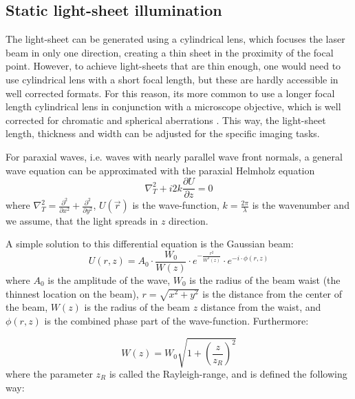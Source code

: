 
  \subsection{Static light-sheet illumination}
    The light-sheet can be generated using a cylindrical lens, which focuses the laser beam in only one direction, creating a thin sheet in the proximity of the focal point. However, to achieve light-sheets that are thin enough, one would need to use cylindrical lens with a short focal length, but these are hardly accessible in well corrected formats. For this reason, its more common to use a longer focal length cylindrical lens in conjunction with a microscope objective, which is well corrected for chromatic and spherical aberrations \cite{greger_basic_2007}. This way, the light-sheet length, thickness and width can be adjusted for the specific imaging tasks.

    For paraxial waves, i.e. waves with nearly parallel wave front normals, a general wave equation can be approximated with the paraxial Helmholz equation \cite{krzic_multiple-view_2009, saleh_fundamentals_2007}
    \begin{equation}
      \nabla_T^2 + i 2k \frac{\partial U}{\partial z} = 0
      \label{eq:helmholtz}
    \end{equation}
    where $\nabla_T^2 = \frac{\partial^2}{\partial x^2} + \frac{\partial^2}{\partial y^2}$, $U(\vec{r})$ is the wave-function, $k=\frac{2\pi}{\lambda}$ is the wavenumber and we assume, that the light spreads in $z$ direction.
    
    A simple solution to this differential equation is the Gaussian beam:
    \begin{equation}
      U(r,z) = A_0 \cdot \frac{W_0}{W(z)} \cdot e^{-\frac{r^2}{W^2(z)}}\cdot e^{-i\cdot \phi(r,z)}
    \label{eq:gaussian}
    \end{equation}
    where $A_0$ is the amplitude of the wave, $W_0$ is the radius of the beam waist (the thinnest location on the beam), $r=\sqrt{x^2+y^2}$ is the distance from the center of the beam, $W(z)$ is the radius of the beam $z$ distance from the waist, and $\phi(r,z)$ is the combined phase part of the wave-function. Furthermore:

    \begin{equation}
      W(z) = W_0\sqrt{1+\left( \frac{z}{z_R} \right)^2}
    \end{equation}
    where the parameter $z_R$ is called the Rayleigh-range, and is defined the following way:

